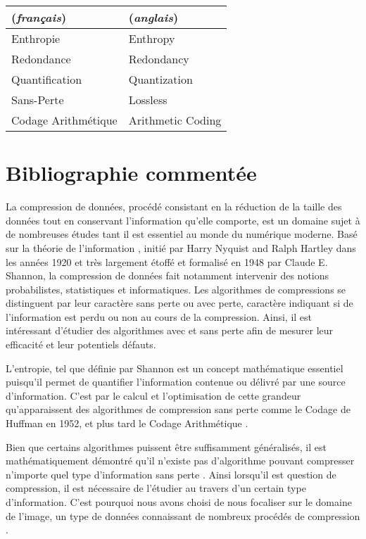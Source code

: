 \documentclass{article}
\begin{document}
\begin{tabular}{l l} 
    (\textit{français}) & (\textit{anglais}) \\ \hline
    Enthropie & Enthropy \\
    Redondance & Redondancy \\
    Quantification & Quantization \\
    Sans-Perte & Lossless \\
    Codage Arithmétique & Arithmetic Coding \\
    \end{tabular}

\section*{Bibliographie comment\'ee}

La compression de données, procédé consistant en la réduction de la taille des données tout en conservant l'information qu'elle comporte, est un domaine sujet à de nombreuses études tant il est essentiel au monde du numérique moderne. Basé sur la théorie de l'information \cite{entropy}, initié par Harry Nyquist and Ralph Hartley dans les ann\'ees 1920 et très largement étoffé et formalisé en 1948 par Claude E. Shannon, la compression de données fait notamment intervenir des notions probabilistes, statistiques et informatiques. Les algorithmes de compressions se distinguent par leur caractère sans perte ou avec perte, caractère indiquant si de l'information est perdu ou non au cours de la compression. Ainsi, il est intéressant d'étudier des algorithmes avec et sans perte afin de mesurer leur efficacité et leur potentiels défauts.

L'entropie, tel que définie par Shannon \cite{entropy} est un concept mathématique essentiel puisqu'il permet de quantifier l'information contenue ou délivré par une source d'information. C'est par le calcul et l'optimisation de cette grandeur qu'apparaissent des algorithmes de compression sans perte comme le Codage de Huffman \cite{huffman} en 1952, et plus tard le Codage Arithmétique \cite{arithmetic-coding}.

Bien que certains algorithmes puissent être suffisamment généralisés, il est mathématiquement démontré qu'il n'existe pas d'algorithme pouvant compresser n'importe quel type d'information sans perte \cite{compression}. Ainsi lorsqu'il est question de compression, il est nécessaire de l'étudier au travers d'un certain type d'information. C'est pourquoi nous avons choisi de nous focaliser sur le domaine de l'image, un type de données connaissant de nombreux procédés de compression \cite{compression} \cite{code-theory}.
\end{document}
